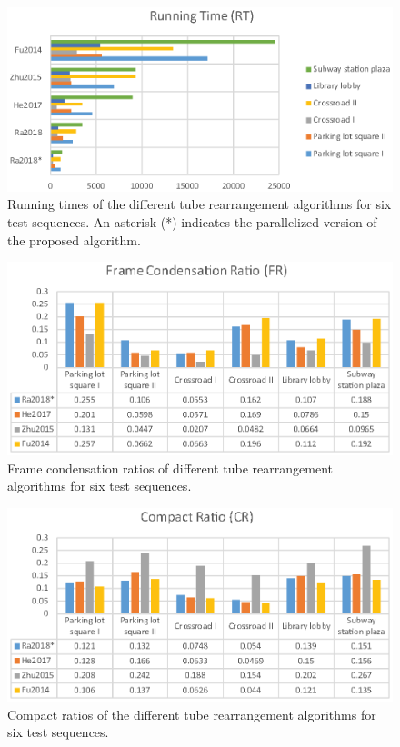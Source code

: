 \documentclass[11pt]{hyu_thesis}
\begin{document}
\begin{figure}[t]
\begin{center}
\includegraphics[width=0.9\linewidth]{RT.eps}
\end{center}
   \caption{Running times of the different tube rearrangement algorithms for six test sequences. An asterisk (*) indicates the parallelized version of the proposed algorithm.}
\label{fig:RT}
\end{figure}

\begin{figure}[t]
\begin{center}
\includegraphics[width=0.9\linewidth]{FCR.eps}
\end{center}
   \caption{Frame condensation ratios of different tube rearrangement algorithms for six test sequences.}
\label{fig:FCR}
\end{figure}

\begin{figure}[t]
\begin{center}
\includegraphics[width=0.9\linewidth]{CR.eps}
\end{center}
   \caption{Compact ratios of the different tube rearrangement algorithms for six test sequences.}
\label{fig:CR}
\end{figure}
\end{document}
